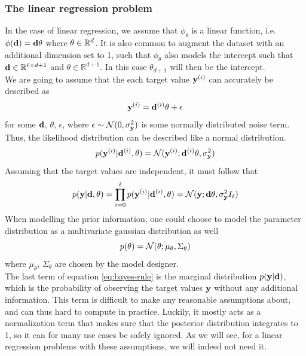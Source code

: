 \subsubsection{The linear regression problem}
In the case of linear regression, we assume that $\phi_\theta$ is a linear function, i.e. $\phi(\mathbf{d}) = \mathbf{d}\mathbf{\theta}$ where $\mathbf{\theta}\in \mathbb{R}^{d}$. 
It is also common to augment the dataset with an additional dimension set to 1, such that $\phi_\theta$ also models the intercept such that $\mathbf{d} \in \mathbb{R}^{\ell \times d + 1}$ and $\theta \in \mathbb{R}^{d + 1}$. In this case $\theta_{d+1}$ will then be the intercept.\\

We are going to assume that the each target value $\mathbf{y}^{(i)}$ can accurately be described as
\begin{equation}
  \label{eq:likelihood-generating}
  \mathbf{y}^{(i)} = \mathbf{d}^{(i)}\theta + \epsilon
\end{equation}
for some $\mathbf{d}$, $\theta$, $\epsilon$, where $\epsilon \sim \mathcal{N}(0, \sigma^2_{\mathbf{y}})$ is some normally distributed noise term.
Thus, the likelihood distribution can be described like a normal distribution.
\begin{equation}
  \label{eq:likelihood-single}
  p(\textbf{y}^{(i)} | \mathbf{d}^{(i)}, \mathbf{\theta}) = \mathcal{N}(\mathbf{y}^{(i)}; \mathbf{d}^{(i)}\mathbf{\theta}, \sigma^2_{\mathbf{y}})
\end{equation}
Assuming that the target values are independent, it must follow that
\begin{equation}
  \label{eq:likelihood}
  p(\textbf{y} | \mathbf{d}, \mathbf{\theta}) = \prod_{i=0}^\ell p(\textbf{y}^{(i)} | \mathbf{d}^{(i)}, \mathbf{\theta}) = \mathcal{N}(\mathbf{y}; \mathbf{d}\mathbf{\theta}, \sigma^2_{\mathbf{y}}I_\ell)
\end{equation}
When modelling the prior information, one could choose to model the parameter distribution as a multivariate gaussian distribution as well
\begin{equation}
  \label{eq:prior}
  p(\mathbf{\theta}) = \mathcal{N}(\theta; \mu_{\theta}, \Sigma_\theta)
\end{equation}
where $\mu_\theta$, $\Sigma_\theta$ are chosen by the model designer. \\
The last term of equation \ref{eq:bayes-rule} is the marginal distribution $p(\mathbf{y}| \mathbf{d})$, which is the probability of observing the target values $\mathbf{y}$ without any additional information. 
This term is difficult to make any reasonable assumptions about, and can thus hard to compute in practice.
Luckily, it mostly acts as a normalization term that makes sure that the posterior distribution integrates to 1, so it can for many use cases be safely ignored.
As we will see, for a linear regression problems with these assumptions, we will indeed not need it.
